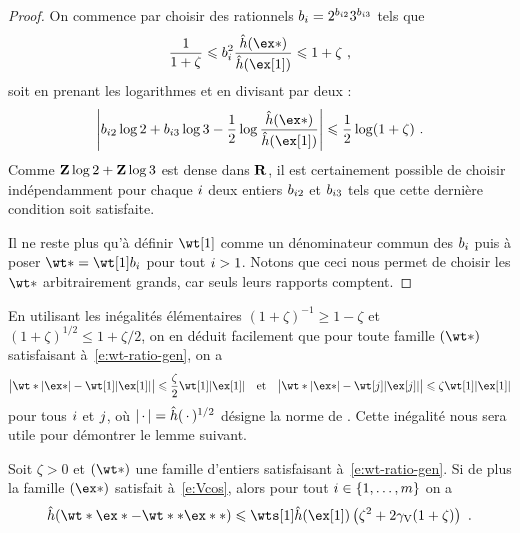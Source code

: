 \begin{proof}
  On commence par choisir des rationnels \( b_i = 2^{b_{i2}}
    3^{b_{i3}} \) tels que
  \begin{equation}
    \frac1{1 + \zeta}
    \le
    b_\fct^2 \frac{ \hautn{\ex*} }{ \hautn{\ex[1]} }
    \le
    1 + \zeta
    \pmm,
  \end{equation}
  soit en prenant les logarithmes et en divisant par deux :
  \begin{equation}
    \abs*{
      b_{\fct2} \log 2 + b_{\fct3} \log 3
      - \frac12 \log \frac{ \hautn{\ex*} }{ \hautn{\ex[1]} }
    }
    \le
    \frac12 \log (1 + \zeta)
    \pmm.
  \end{equation}
  Comme \( {\mathbf{Z}} \log2 + {\mathbf{Z}} \log 3 \) est dense dans \( {\mathbf{R}} \), il est
  certainement possible de choisir indépendamment pour chaque \( i \) deux
  entiers \( b_{i2} \) et \( b_{i3} \) tels que cette dernière condition
  soit satisfaite.

  Il ne reste plus qu'à définir \( \wt[1] \) comme un dénominateur commun des
  \( b_i \) puis à poser \( \wt* = \wt[1] b_\fct \) pour tout \( i > 1
  \). Notons que ceci nous permet de choisir les \( \wt* \) arbitrairement
  grands, car seuls leurs rapports comptent.
\end{proof}

En utilisant les inégalités élémentaires \( (1 + \zeta)^{-1} \ge 1 - \zeta \)
et \( (1 + \zeta)^{1/2} \le 1 + \zeta/2 \), on en déduit facilement que pour
toute famille \( (\wt*) \) satisfaisant à~\eqref{e:wt-ratio-gen}, on a
\begin{equation} \label{e:wt-diff-nnt-gen}
  \abs[\big]{ \wt* \nnt{\ex*} - \wt[1] \nnt{\ex[1]} }
  \le
  \frac\zeta2 \wt[1] \nnt{\ex[1]}
  \quad\text{et}\quad
  \abs[\big]{ \wt* \nnt{\ex*} - \wt[\fcti] \nnt{\ex[\fcti]} }
  \le
  \zeta \wt[1] \nnt{\ex[1]}
\end{equation}
pour tous \( i \) et \( j \), où \( \lvert{\,\cdot\,}\rvert = \hat h ({\,\cdot\,})^{1/2} \)
désigne la norme de \NT. Cette inégalité nous sera utile pour démontrer le
lemme suivant.

\begin{lem}
  Soit \( \zeta > 0 \) et \( (\wt*) \) une famille d'entiers satisfaisant
  à~\eqref{e:wt-ratio-gen}. Si de plus la famille \( (\ex*) \) satisfait
  à~\eqref{e:Vcos}, alors pour tout \( i \in \lbrace1, \dots, m\rbrace \) on a
  \begin{equation}
    \hautn{\wt* \ex* - \wt** \ex**}
    \le
    \wts[1] \hautn{\ex[1]} \left(
      \zeta^2 + 2 \Vcos (1 + \zeta)
    \right)
    \pmm.
  \end{equation}
\end{lem}

